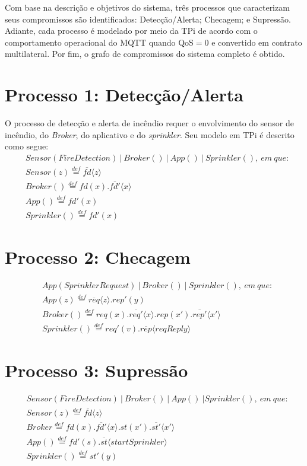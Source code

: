Com base na descrição e objetivos do sistema, três processos que caracterizam seus compromissos são identificados: Detecção/Alerta; Checagem; e Supressão. Adiante, cada processo é modelado por meio da TPi de acordo com o comportamento operacional do MQTT quando QoS$=0$ e convertido em contrato multilateral. Por fim, o grafo de compromissos do sistema completo é obtido.

\section{Processo 1: Detecção/Alerta}

O processo de detecção e alerta de incêndio requer o envolvimento do sensor de incêndio, do \textit{Broker}, do aplicativo e do \textit{sprinkler}. Seu modelo em TPi é descrito como segue:
\begin{align}
& Sensor(FireDetection)~|~Broker()~|~App()~|~Sprinkler(),~em~que: \nonumber \\
& Sensor(z) \stackrel{def}{=} \overline{fd}\langle z \rangle \nonumber \\
& Broker() \stackrel{def}{=} fd(x).\overline{fd'}\langle x \rangle \nonumber \\
& App() \stackrel{def}{=} fd'(x) \nonumber \\
& Sprinkler() \stackrel{def}{=} fd'(x)
\end{align}

\section{Processo 2: Checagem}

\begin{align}
& App(SprinklerRequest)~|~Broker()~|~Sprinkler(),~em~que: \nonumber \\
& App(z) \stackrel{def}{=} \overline{req}\langle z \rangle . rep'(y) \nonumber \\
& Broker() \stackrel{def}{=} req(x) . \overline{req'}\langle x \rangle . rep(x') . \overline{rep'}\langle x' \rangle \nonumber \\
& Sprinkler() \stackrel{def}{=} req'(v) . \overline{rep}\langle reqReply \rangle
\end{align}

\section{Processo 3: Supressão}

\begin{align}
&Sensor(FireDetection)~|~Broker()~|~App()~|Sprinkler(),~em~que: \nonumber \\
&Sensor(z) \stackrel{def}{=} \overline{fd}\langle z \rangle \nonumber \\
&Broker \stackrel{def}{=} fd(x) . \overline{fd'}\langle x \rangle .  st(x') . \overline{st'}\langle x' \rangle \nonumber \\
&App() \stackrel{def}{=} fd'(s) . \overline{st}\langle startSprinkler \rangle  \nonumber \\
&Sprinkler() \stackrel{def}{=} st'(y)
\end{align}